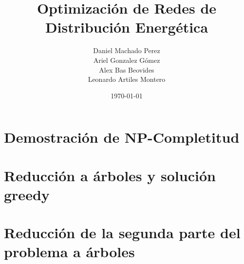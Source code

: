 \documentclass[12pt]{article}
\title{Optimización de Redes de Distribución
Energética}
\author{Daniel Machado Perez\\Ariel Gonzalez Gómez\\Alex Bas Beovides\\Leonardo Artiles Montero}
\date{\today}
\begin{document}
\maketitle



\hline{}
\section{Demostración de NP-Completitud}


%

\hline
\section{Reducción a árboles y solución greedy}


\hline
\section{Reducción de la segunda parte del problema a árboles}

\end{document}
